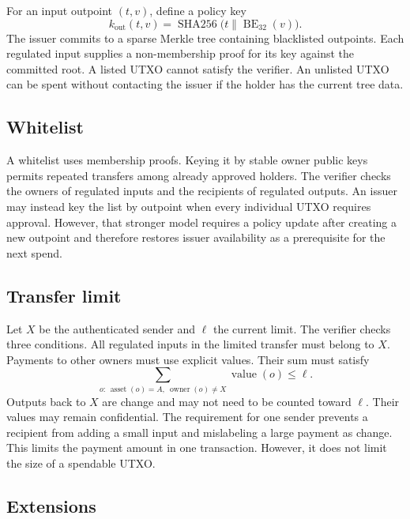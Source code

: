 \documentclass[11pt]{article}
\newcommand{\sha}{\operatorname{SHA256}}
\newcommand{\concat}{\mathbin\|}
\begin{document}
    For an input outpoint $(t,v)$, define a policy key
    \begin{equation}
        k_{\mathrm{out}}(t,v)=\sha\bigl(t\concat\operatorname{BE}_{32}(v)\bigr).
    \end{equation}
    The issuer commits to a sparse Merkle tree containing blacklisted outpoints.
    Each regulated input supplies a non-membership proof for its key against the committed root.
    A listed UTXO cannot satisfy the verifier.
    An unlisted UTXO can be spent without contacting the issuer if the holder has the current tree data.

    \subsection{Whitelist}

    A whitelist uses membership proofs.
    Keying it by stable owner public keys permits repeated transfers among already approved holders.
    The verifier checks the owners of regulated inputs and the recipients of regulated outputs.
    An issuer may instead key the list by outpoint when every individual UTXO requires approval.
    However, that stronger model requires a policy update after creating a new outpoint and therefore restores issuer availability as a prerequisite for the next spend.

    \subsection{Transfer limit}

    Let $X$ be the authenticated sender and $\ell$ the current limit.
    The verifier checks three conditions.
    All regulated inputs in the limited transfer must belong to $X$.
    Payments to other owners must use explicit values.
    Their sum must satisfy
    \begin{equation}
        \sum_{o:\,\operatorname{asset}(o)=A,\ \operatorname{owner}(o)\ne X}
        \operatorname{value}(o)\leq\ell.
    \end{equation}
    Outputs back to $X$ are change and may not need to be counted toward $\ell$.
    Their values may remain confidential.
    The requirement for one sender prevents a recipient from adding a small input and mislabeling a large payment as change.
    This limits the payment amount in one transaction.
    However, it does not limit the size of a spendable UTXO.

    \subsection{Extensions}
\end{document}

